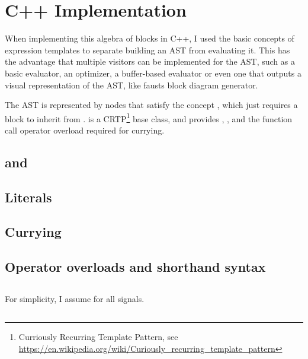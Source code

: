 \section{C++ Implementation}

When implementing this algebra of blocks in C++, I used the basic concepts of expression templates to separate building an AST from evaluating it. This has the advantage that multiple visitors can be implemented for the AST, such as a basic evaluator, an optimizer, a buffer-based evaluator or even one that outputs a visual representation of the AST, like fausts block diagram generator.

The AST is represented by nodes that satisfy the concept , which just requires a block  to inherit from .  is a CRTP\footnote{Curriously Recurring Template Pattern, see \url{https://en.wikipedia.org/wiki/Curiously_recurring_template_pattern}} base class, and provides , , and the function call operator overload required for currying.

\subsection{ and }
\subsection{Literals}
\subsection{Currying}
\subsection{Operator overloads and shorthand syntax}


\subsection{}
For simplicity, I assume  for all signals.
\subsection{}


